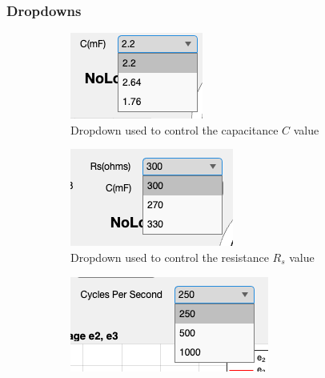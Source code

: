 \subsubsection{Dropdowns}
\begin{figure}[H]
     \centering
     \begin{subfigure}[b]{0.3\textwidth}
         \centering
    	 \includegraphics[width=\textwidth]{graphics/visualisation/ui_dropdowns_C}
     	\caption{Dropdown used to control the capacitance $C$ value}
     \end{subfigure}
     \hfill
     \begin{subfigure}[b]{0.3\textwidth}
         \centering
    	 \includegraphics[width=\textwidth]{graphics/visualisation/ui_dropdowns_Rs}
     	\caption{Dropdown used to control the resistance $R_s$ value}
     \end{subfigure}
     \hfill
     \begin{subfigure}[b]{0.3\textwidth}
         \centering
    	 \includegraphics[width=\textwidth]{graphics/visualisation/ui_dropdowns_cycles}

\end{subfigure}
\end{figure}

